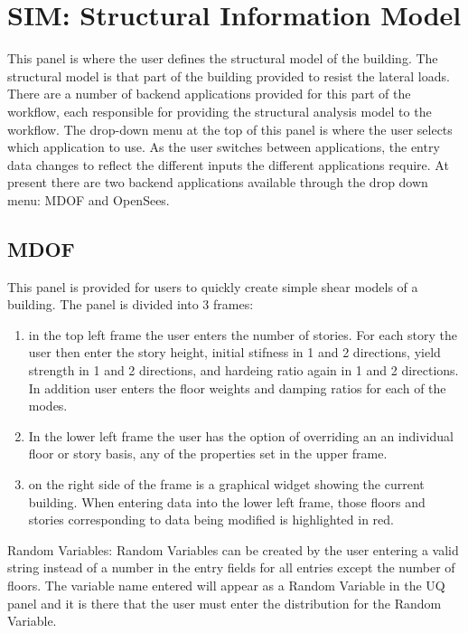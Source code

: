 \section{SIM: Structural Information Model}

This panel is where the user defines the structural model of the building. The structural model is that part of the building provided to resist the lateral loads. There are a number of backend applications provided for this part of the workflow, each responsible for providing the structural analysis model to the workflow. The drop-down menu at the top of this panel is where the user selects which application to use. As the user switches between applications, the entry data changes to reflect the different inputs the different applications require. At present there are two backend applications available through the drop down menu: MDOF and OpenSees.

\subsection{MDOF}

This panel is provided for users to quickly create simple shear models of a building. The panel is divided into 3 frames:
\begin{enumerate}
\item in the top left frame the user enters the number of stories. For each story the user then enter the story height, initial stifness in 1 and 2 directions, yield strength in 1 and 2 directions, and hardeing ratio again in 1 and 2 directions. In addition user enters the floor weights and damping ratios for each of the modes.
\item In the lower left frame the user has the option of overriding an an individual floor or story basis, any of the properties set in the upper frame.
\item on the right side of the frame is a graphical widget showing the current building. When entering data into the lower left frame, those floors and stories corresponding to data being modified is highlighted in red.
\end{enumerate} 

Random Variables: Random Variables can be created by the user entering a valid string instead of a number in the entry fields for all entries except the number of floors. The variable name entered will appear as a Random Variable in the UQ panel and it is there that the user must enter the distribution for the Random Variable.


